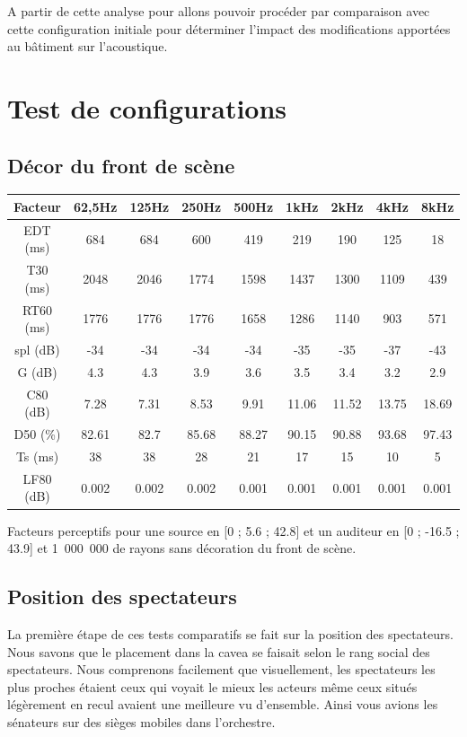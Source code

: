A partir de cette analyse pour allons pouvoir procéder par comparaison avec cette configuration initiale pour déterminer l'impact des modifications apportées au bâtiment sur l'acoustique.
		
\chapter{Test de configurations}
	\minitoc
	\newpage

\section{Décor du front de scène}


\begin{tableth} 
 \begin{tabular}{| *{9}{c|}} 
 \hline 
 Facteur & 62,5Hz & 125Hz & 250Hz & 500Hz & 1kHz & 2kHz & 4kHz & 8kHz \\ 
 \hline 
 \hline 
\gls{EDT} (ms)& 684& 684& 600& 419& 219& 190& 125& 18 \\ 
 \hline 
\gls{T30} (ms)& 2048& 2046& 1774& 1598& 1437& 1300& 1109& 439 \\ 
 \hline 
\gls{RT60} (ms)& 1776& 1776& 1776& 1658& 1286& 1140& 903& 571 \\ 
 \hline 
\gls{spl} (dB)& -34& -34& -34& -34& -35& -35& -37& -43 \\ 
 \hline 
\gls{G} (dB)& 4.3& 4.3& 3.9& 3.6& 3.5& 3.4& 3.2& 2.9 \\
 \hline 
\gls{C80} (dB)& 7.28& 7.31& 8.53& 9.91& 11.06& 11.52& 13.75& 18.69 \\ 
 \hline 
\gls{D50} (\%)& 82.61& 82.7& 85.68& 88.27& 90.15& 90.88& 93.68& 97.43 \\ 
 \hline 
\gls{Ts} (ms)& 38& 38& 28& 21& 17& 15& 10& 5 \\ 
 \hline 
\gls{LF80} (dB)& 0.002& 0.002& 0.002& 0.001& 0.001& 0.001& 0.001& 0.001 \\ 
 \hline 
\end{tabular} 
 \caption{Facteurs perceptifs pour une source en [0 ; 5.6 ; 42.8] et un auditeur en [0 ; -16.5 ; 43.9] et 1~000~000 de rayons sans décoration du front de scène.} 
 \label{tab_fact_init} 
 \end{tableth}


\section{Position des spectateurs}
La première étape de ces tests comparatifs se fait sur la position des spectateurs. Nous savons que le placement dans la \gls{cavea} se faisait selon le rang social des spectateurs. Nous comprenons facilement que visuellement, les spectateurs les plus proches étaient ceux qui voyait le mieux les acteurs même ceux situés légèrement en recul avaient une meilleure vu d'ensemble. Ainsi vous avions les sénateurs sur des sièges mobiles dans l'orchestre.

